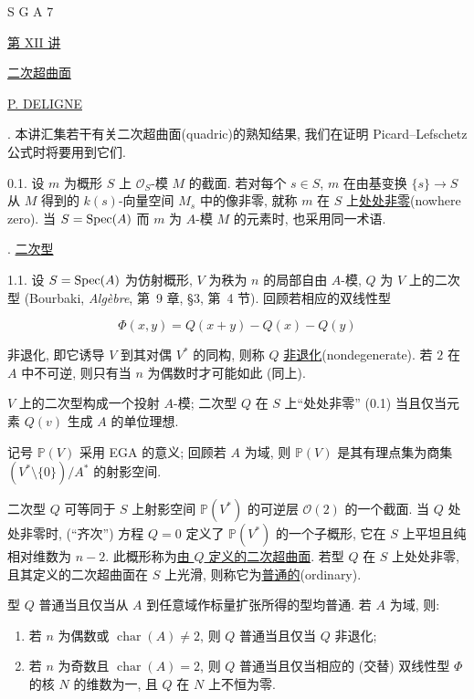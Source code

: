 \clearpage
\ExposeTOC
\begin{center}
S G A 7

\bigskip
\underline{第 XII 讲}

\bigskip
\underline{二次超曲面}

\bigskip
\underline{P. DELIGNE}
\end{center}

. 本讲汇集若干有关二次超曲面(quadric)的熟知结果, 我们在证明 Picard--Lefschetz 公式时将要用到它们.

0.1. 设 $m$ 为概形 $S$ 上 $\mathcal O_S$-模 $M$ 的截面. 若对每个 $s\in S$, $m$ 在由基变换 $\{s\}\longrightarrow S$ 从 $M$ 得到的 $k(s)$-向量空间 $M_s$ 中的像非零, 就称 $m$ 在 $S$ 上\underline{处处非零}(nowhere zero). 当 $S=\operatorname{Spec}(A)$ 而 $m$ 为 $A$-模 $M$ 的元素时, 也采用同一术语.

. \underline{二次型}

1.1. 设 $S=\operatorname{Spec}(A)$ 为仿射概形, $V$ 为秩为 $n$ 的局部自由 $A$-模, $Q$ 为 $V$ 上的二次型 (Bourbaki, \emph{Algèbre}, 第~9 章, \S3, 第~4 节). 回顾若相应的双线性型

\begin{equation*}
\Phi(x,y)=Q(x+y)-Q(x)-Q(y)
\end{equation*}

非退化, 即它诱导 $V$ 到其对偶 $V^*$ 的同构, 则称 $Q$ \underline{非退化}(nondegenerate). 若 $2$ 在 $A$ 中不可逆, 则只有当 $n$ 为偶数时才可能如此 (同上).


$V$ 上的二次型构成一个投射 $A$-模; 二次型 $Q$ 在 $S$ 上``处处非零'' (0.1) 当且仅当元素 $Q(v)$ 生成 $A$ 的单位理想.

记号 $\mathbb P(V)$ 采用 EGA 的意义; 回顾若 $A$ 为域, 则 $\mathbb P(V)$ 是其有理点集为商集 $(V^*\setminus\{0\})/A^*$ 的射影空间.

二次型 $Q$ 可等同于 $S$ 上射影空间 $\mathbb P(V^*)$ 的可逆层 $\mathcal O(2)$ 的一个截面. 当 $Q$ 处处非零时, (``齐次'') 方程 $Q=0$ 定义了 $\mathbb P(V^*)$ 的一个子概形, 它在 $S$ 上平坦且纯相对维数为 $n-2$. 此概形称为\underline{由 $Q$ 定义的二次超曲面}. 若型 $Q$ 在 $S$ 上处处非零, 且其定义的二次超曲面在 $S$ 上光滑, 则称它为\underline{普通的}(ordinary).

型 $Q$ 普通当且仅当从 $A$ 到任意域作标量扩张所得的型均普通. 若 $A$ 为域, 则:

\begin{enumerate}[label=\alph*),leftmargin=2.5em]
\item 若 $n$ 为偶数或 $\operatorname{char}(A)\ne2$, 则 $Q$ 普通当且仅当 $Q$ 非退化;

\item 若 $n$ 为奇数且 $\operatorname{char}(A)=2$, 则 $Q$ 普通当且仅当相应的 (交替) 双线性型 $\Phi$ 的核 $N$ 的维数为一, 且 $Q$ 在 $N$ 上不恒为零.
\end{enumerate}

